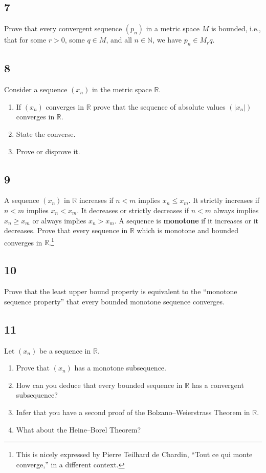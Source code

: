 \documentclass{amsart}
\begin{document}
\subsection*{7}
Prove that every convergent sequence $(p_n)$ in a metric space $M$ is bounded, i.e., that for some $r>0$, some $q \in M$, and all $n \in \mathbb{N}$, we have $p_n \in M_r q$.

\subsection*{8}
Consider a sequence $(x_n)$ in the metric space $\mathbb{R}$.
\begin{enumerate}[label=(\alph*)]
\item If $(x_n)$ converges in $\mathbb{R}$ prove that the sequence of absolute values $(|x_n|)$ converges in $\mathbb{R}$.
\item State the converse.
\item Prove or disprove it.
\end{enumerate}

\subsection*{9}
A sequence $(x_n)$ in $\mathbb{R}$ increases if $n<m$ implies $x_n \le x_m$. It strictly increases if $n<m$ implies $x_n < x_m$. It decreases or strictly decreases if $n<m$ always implies $x_n \ge x_m$ or always implies $x_n > x_m$. A sequence is \textbf{monotone} if it increases or it decreases. Prove that every sequence in $\mathbb{R}$ which is monotone and bounded converges in $\mathbb{R}$.\footnote{This is nicely expressed by Pierre Teilhard de Chardin, ``Tout ce qui monte converge,'' in a different context.}

\subsection*{10}
Prove that the least upper bound property is equivalent to the ``monotone sequence property'' that every bounded monotone sequence converges.

\subsection*{11}
Let $(x_n)$ be a sequence in $\mathbb{R}$.
\begin{enumerate}[label=(\alph*)]
\item[*(a)] Prove that $(x_n)$ has a monotone subsequence.
\item How can you deduce that every bounded sequence in $\mathbb{R}$ has a convergent subsequence?
\item Infer that you have a second proof of the Bolzano--Weierstrass Theorem in $\mathbb{R}$.
\item What about the Heine--Borel Theorem?
\end{enumerate}
\end{document}

